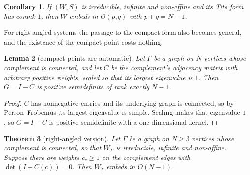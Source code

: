 \documentclass[11pt]{article}
\newtheorem{theorem}{Theorem}[section]
\newtheorem{lemma}[theorem]{Lemma}
\newtheorem{corollary}[theorem]{Corollary}
\theoremstyle{definition}
\theoremstyle{remark}
\theoremstyle{definition}
\begin{document}
\begin{corollary}\label{cor:corank1}
If $(W,S)$ is irreducible, infinite and non-affine and its Tits form has corank $1$, then $W$
embeds in $O(p,q)$ with $p+q=N-1$.
\end{corollary}

For right-angled systems the passage to the compact form also becomes general, and the existence
of the compact point costs nothing.

\begin{lemma}[compact points are automatic]\label{lem:perron}
Let $\Gamma$ be a graph on $N$ vertices whose complement is connected, and let $C$ be the
complement's adjacency matrix with arbitrary positive weights, scaled so that its largest
eigenvalue is $1$. Then $G=I-C$ is positive semidefinite of rank exactly $N-1$.
\end{lemma}

\begin{proof}
$C$ has nonnegative entries and its underlying graph is connected, so by Perron--Frobenius its
largest eigenvalue is simple. Scaling makes that eigenvalue $1$, so $G=I-C$ is positive
semidefinite with a one-dimensional kernel.
\end{proof}

\begin{theorem}[right-angled version]\label{thm:racg}
Let $\Gamma$ be a graph on $N\ge3$ vertices whose complement is connected, so that $W_\Gamma$ is
irreducible, infinite and non-affine. Suppose there are weights $c_e\ge1$ on the complement edges
with $\det(I-C(c))=0$. Then $W_\Gamma$ embeds in $O(N-1)$.
\end{theorem}
\end{document}
